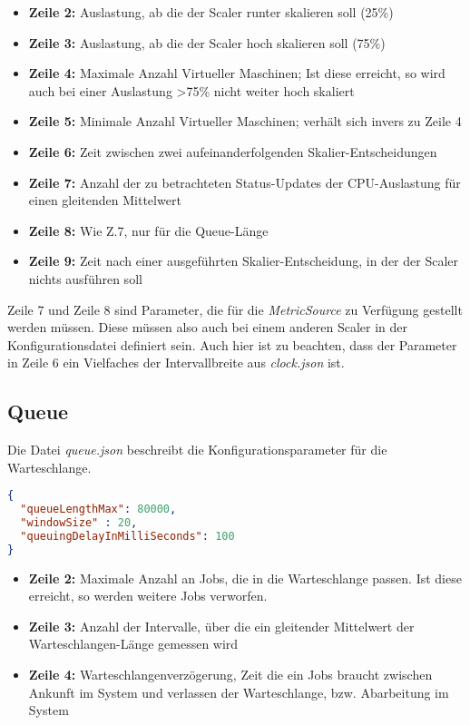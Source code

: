 \begin{itemize}
	\item \textbf{Zeile 2:} Auslastung, ab die der Scaler runter skalieren soll (25\%)
	\item \textbf{Zeile 3:} Auslastung, ab die der Scaler hoch skalieren soll (75\%)
	\item \textbf{Zeile 4:} Maximale Anzahl Virtueller Maschinen; Ist diese erreicht, so wird auch bei einer Auslastung >75\% nicht weiter hoch skaliert
	\item \textbf{Zeile 5:} Minimale Anzahl Virtueller Maschinen; verhält sich invers zu Zeile 4
	\item \textbf{Zeile 6:} Zeit zwischen zwei aufeinanderfolgenden Skalier-Entscheidungen
	\item \textbf{Zeile 7:} Anzahl der zu betrachteten Status-Updates der CPU-Auslastung für einen gleitenden Mittelwert
	\item \textbf{Zeile 8:} Wie Z.7, nur für die Queue-Länge 
	\item \textbf{Zeile 9:} Zeit nach einer ausgeführten Skalier-Entscheidung, in der der Scaler nichts ausführen soll 
	
\end{itemize}

\noindent
Zeile 7 und Zeile 8 sind Parameter, die für die \textit{MetricSource} zu Verfügung gestellt werden müssen. Diese müssen also auch bei einem anderen Scaler in der Konfigurationsdatei definiert sein. Auch hier ist zu beachten, dass der Parameter in Zeile 6 ein Vielfaches der Intervallbreite aus \textit{clock.json} ist.

\subsection{Queue}
Die Datei \textit{queue.json} beschreibt die Konfigurationsparameter für die Warteschlange.



\begin{lstlisting}[language=json,firstnumber=1]
{
  "queueLengthMax": 80000,
  "windowSize" : 20,
  "queuingDelayInMilliSeconds": 100
} 
\end{lstlisting}

\begin{itemize}
	\item \textbf{Zeile 2:} Maximale Anzahl an Jobs, die in die Warteschlange passen. Ist diese erreicht, so werden weitere Jobs verworfen.
	\item \textbf{Zeile 3:} Anzahl der Intervalle, über die ein gleitender Mittelwert der Warteschlangen-Länge gemessen wird  
	\item \textbf{Zeile 4:} Warteschlangenverzögerung, Zeit die ein Jobs braucht zwischen Ankunft im System und verlassen der Warteschlange, bzw. Abarbeitung im System
	
\end{itemize}

